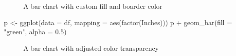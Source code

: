\documentclass[
  letterpaper,
]{article}
\newenvironment{Shaded}{\begin{snugshade}}{\end{snugshade}}
\newcommand{\AttributeTok}[1]{\textcolor[rgb]{0.40,0.45,0.13}{#1}}
\newcommand{\FloatTok}[1]{\textcolor[rgb]{0.68,0.00,0.00}{#1}}
\newcommand{\FunctionTok}[1]{\textcolor[rgb]{0.28,0.35,0.67}{#1}}
\newcommand{\NormalTok}[1]{\textcolor[rgb]{0.00,0.23,0.31}{#1}}
\newcommand{\OtherTok}[1]{\textcolor[rgb]{0.00,0.23,0.31}{#1}}
\newcommand{\SpecialCharTok}[1]{\textcolor[rgb]{0.37,0.37,0.37}{#1}}
\newcommand{\StringTok}[1]{\textcolor[rgb]{0.13,0.47,0.30}{#1}}
\begin{document}
\begin{figure}[H]


\caption{\label{fig-fillandboard}A bar chart with custom fill and
boarder color}

\end{figure}%

\begin{Shaded}
\begin{Highlighting}[]
\NormalTok{p }\OtherTok{\textless{}{-}} \FunctionTok{ggplot}\NormalTok{(}\AttributeTok{data =}\NormalTok{ df, }\AttributeTok{mapping =} \FunctionTok{aes}\NormalTok{(}\FunctionTok{factor}\NormalTok{(Inches)))}
\NormalTok{p }\SpecialCharTok{+} \FunctionTok{geom\_bar}\NormalTok{(}\AttributeTok{fill =} \StringTok{"green"}\NormalTok{, }\AttributeTok{alpha =} \FloatTok{0.5}\NormalTok{)}
\end{Highlighting}
\end{Shaded}

\begin{figure}[H]


\caption{\label{fig-alpha}A bar chart with adjusted color transparency}

\end{figure}%
\end{document}
